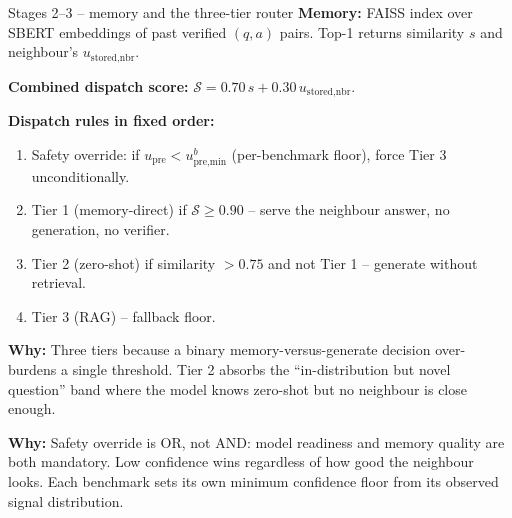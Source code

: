 \documentclass[10pt,aspectratio=169]{beamer}
\newcommand{\why}[1]{{\color{caemamber}\textbf{Why:}} #1}
\begin{document}
\begin{frame}{Stages 2--3 -- memory and the three-tier router}
  \footnotesize
  \textbf{Memory:} FAISS index over SBERT embeddings of past verified $(q,a)$ pairs. Top-1 returns similarity $s$ and neighbour's $u_{\text{stored,nbr}}$.

  \vspace{0.2em}
  \textbf{Combined dispatch score:} $\mathcal{S} = 0.70\,s + 0.30\,u_{\text{stored,nbr}}$.

  \vspace{0.2em}
  \textbf{Dispatch rules in fixed order:}
  \begin{enumerate}\small
    \item Safety override: if $u_{\text{pre}} < u_{\text{pre,min}}^b$ (per-benchmark floor), force Tier 3 unconditionally.
    \item Tier 1 (memory-direct) if $\mathcal{S} \ge 0.90$ -- serve the neighbour answer, no generation, no verifier.
    \item Tier 2 (zero-shot) if similarity $> 0.75$ and not Tier 1 -- generate without retrieval.
    \item Tier 3 (RAG) -- fallback floor.
  \end{enumerate}

  \why{Three tiers because a binary memory-versus-generate decision over-burdens a single threshold. Tier 2 absorbs the ``in-distribution but novel question'' band where the model knows zero-shot but no neighbour is close enough.}

  \why{Safety override is OR, not AND: model readiness and memory quality are both mandatory. Low confidence wins regardless of how good the neighbour looks. Each benchmark sets its own minimum confidence floor from its observed signal distribution.}
\end{frame}
\end{document}
